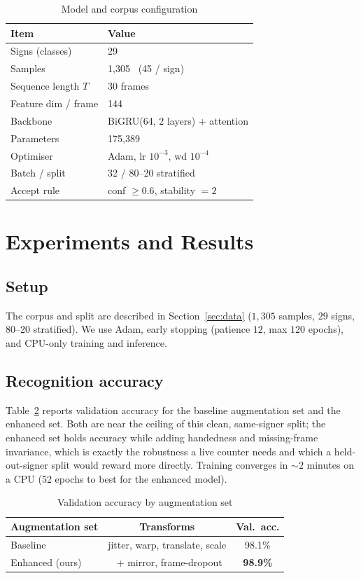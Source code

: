 \documentclass[conference]{IEEEtran}
\begin{document}
\begin{table}[t]
\caption{Model and corpus configuration}
\label{tab:cfg}
\centering
\begin{tabular}{@{}ll@{}}
\toprule
\textbf{Item} & \textbf{Value} \\
\midrule
Signs (classes) & 29 \\
Samples & 1{,}305 \ (45 / sign) \\
Sequence length $T$ & 30 frames \\
Feature dim / frame & 144 \\
Backbone & BiGRU(64, 2 layers) + attention \\
Parameters & 175{,}389 \\
Optimiser & Adam, lr $10^{-3}$, wd $10^{-4}$ \\
Batch / split & 32 / 80--20 stratified \\
Accept rule & conf $\geq 0.6$, stability $=2$ \\
\bottomrule
\end{tabular}
\end{table}

\section{Experiments and Results}
\subsection{Setup}
The corpus and split are described in Section~\ref{sec:data} ($1{,}305$ samples,
$29$ signs, 80--20 stratified). We use Adam, early stopping (patience $12$, max
$120$ epochs), and CPU-only training and inference.

\subsection{Recognition accuracy}
Table~\ref{tab:res} reports validation accuracy for the baseline augmentation
set and the enhanced set. Both are near the ceiling of this clean,
same-signer split; the enhanced set holds accuracy while adding handedness and
missing-frame invariance, which is exactly the robustness a live counter needs
and which a held-out-signer split would reward more directly. Training converges
in $\sim$$2$ minutes on a CPU (52 epochs to best for the enhanced model).

\begin{table}[t]
\caption{Validation accuracy by augmentation set}
\label{tab:res}
\centering
\begin{tabular}{@{}lcc@{}}
\toprule
\textbf{Augmentation set} & \textbf{Transforms} & \textbf{Val.\ acc.} \\
\midrule
Baseline & jitter, warp, translate, scale & 98.1\% \\
Enhanced (ours) & \ + mirror, frame-dropout & \textbf{98.9\%} \\
\bottomrule
\end{tabular}
\end{table}
\end{document}
